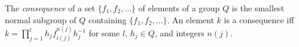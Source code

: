 The \textit{consequence} of a set $\{f_1, f_2, \ldots\}$ of elements of a group $Q$ is the smallest normal subgroup of $Q$ containing $\{f_1, f_2, \ldots\}$. An element $k$ is a consequence iff $k = \prod_{j=1}^{l} h_j f_{i(j)}^{n(j)} h_j^{-1}$ for some $l$, $h_j \in Q$, and integers $n(j)$.
